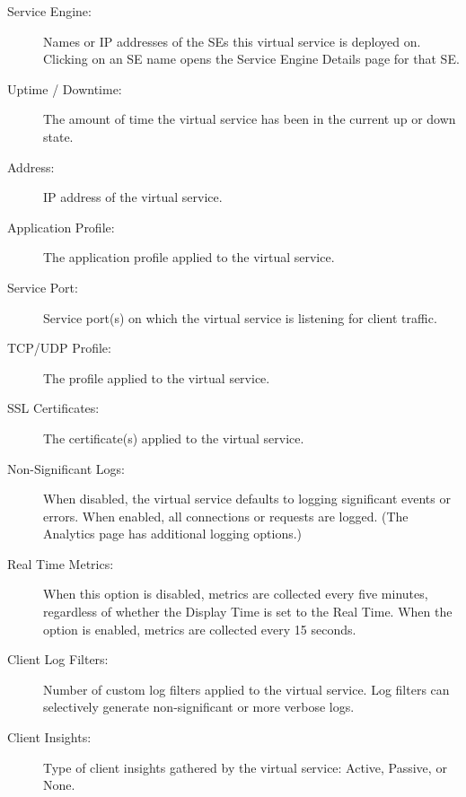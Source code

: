 \documentclass[letterpaper,10pt,english]{sphinxmanual}
\begin{document}
\begin{description}
\item[{Service Engine:}] \leavevmode
Names or IP addresses of the SEs this virtual service is deployed on. Clicking on an SE name opens the Service Engine Details page for that SE.

\item[{Uptime / Downtime:}] \leavevmode
The amount of time the virtual service has been in the current up or down state.

\item[{Address:}] \leavevmode
IP address of the virtual service.

\item[{Application Profile:}] \leavevmode
The application profile applied to the virtual service.

\item[{Service Port:}] \leavevmode
Service port(s) on which the virtual service is listening for client traffic.

\item[{TCP/UDP Profile:}] \leavevmode
The profile applied to the virtual service.

\item[{SSL Certificates:}] \leavevmode
The certificate(s) applied to the virtual service.

\item[{Non-Significant Logs:}] \leavevmode
When disabled, the virtual service defaults to logging significant events or errors. When enabled, all connections or requests are logged. (The Analytics page has additional logging options.)

\item[{Real Time Metrics:}] \leavevmode
When this option is disabled, metrics are collected every five minutes, regardless of whether the Display Time is set to the Real Time. When the option is enabled, metrics are collected every 15 seconds.

\item[{Client Log Filters:}] \leavevmode
Number of custom log filters applied to the virtual service. Log filters can selectively generate non-significant or more verbose logs.

\item[{Client Insights:}] \leavevmode
Type of client insights gathered by the virtual service: Active, Passive, or None.

\end{description}
\end{document}
